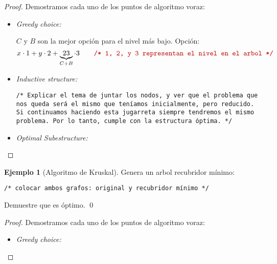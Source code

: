 \documentclass[english, spanish, fleqn, 10pt]{article}
\newcommand{\comentarioc}[1]{\texttt{\textcolor{webred}{/* #1 */}}}
\numberwithin{equation}{section}
\theoremstyle{definition}
\newtheorem{beforeExample}{Ejemplo}[section]
\newenvironment{ejemplo}[1][]{\begin{beforeExample}[#1]\renewcommand{\qedsymbol}{$\blacksquare$}}{\qed\end{beforeExample}}
\begin{document}
\begin{proof}
	Demostramos cada uno de los puntos de algoritmo voraz:
	\begin{itemize}
		\item \emph{Greedy choice:}

		$C$ y $B$ son la mejor opción para el nivel más bajo. Opción:
		\begin{equation*}
		x\cdot 1+y\cdot 2+\underbrace{23}_{C+B}\cdot 3\qquad\comentarioc{1, 2, y 3 representan el nivel en el arbol}
		\end{equation*}

		\item \emph{Inductive structure:}

		\comentarioc{Explicar el tema de juntar los nodos, y ver que el problema que nos queda será el mismo que teníamos inicialmente, pero reducido. Si continuamos haciendo esta jugarreta siempre tendremos el mismo problema. Por lo tanto, cumple con la estructura óptima.}

		\item \emph{Optimal Subestructure:}

	\end{itemize}
\end{proof}

\begin{ejemplo}[Algoritmo de Kruskal]
	Genera un arbol recubridor mínimo:
	\begin{center}
		\comentarioc{colocar ambos grafos: original y recubridor mínimo}
	\end{center}
	Demuestre que es óptimo.
\end{ejemplo}
\begin{proof}
	Demostramos cada uno de los puntos de algoritmo voraz:
	\begin{itemize}
		\item \emph{Greedy choice:}
	\end{itemize}
\end{proof}
\end{document}
